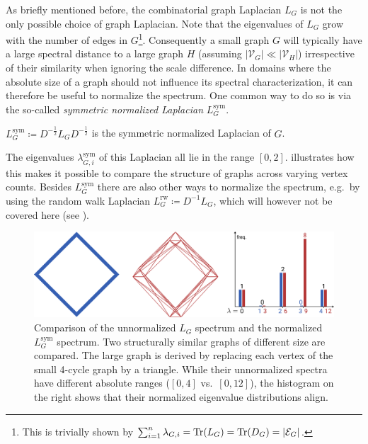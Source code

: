 As briefly mentioned before, the combinatorial graph Laplacian $L_G$ is not the only possible choice of graph Laplacian.
Note that the eigenvalues of $L_G$ grow with the number of edges in $G$\footnote{
	This is trivially shown by $\sum_{i=1}^n \lambda_{G,i} = \operatorname{Tr}(L_G) = \operatorname{Tr}(D_G) = |\mathcal{E}_G|$.
}.
Consequently a small graph $G$ will typically have a large spectral distance to a large graph $H$ (assuming ${|\mathcal{V}_G|} \ll {|\mathcal{V}_H|}$) irrespective of their similarity when ignoring the scale difference.
In domains where the absolute size of a graph should not influence its spectral characterization, it can therefore be useful to normalize the spectrum.
One common way to do so is via the so-called \textit{symmetric normalized Laplacian} $L^{\text{sym}}_G$.
\begin{defn}
	$L^{\text{sym}}_G \coloneqq D^{-\frac{1}{2}} L_G D^{-\frac{1}{2}}$ is the symmetric normalized Laplacian of $G$.
\end{defn}
The eigenvalues $\lambda^{\text{sym}}_{G, i}$  of this Laplacian all lie in the range $[0, 2]$.
 illustrates how this makes it possible to compare the structure of graphs across varying vertex counts.
Besides $L^{\text{sym}}_G$ there are also other ways to normalize the spectrum, e.g.\ by using the random walk Laplacian $L^{\text{rw}}_G \coloneqq D^{-1} L_G$, which will however not be covered here (see \citet{Shuman2013}).
\begin{figure}[ht]
	\centering
	\includegraphics[width=\linewidth]{gfx/related-work/spectral-normalization.pdf}
	\caption[Comparison of the unnormalized $L_G$ spectrum and the normalized $L^{\text{sym}}_G$ spectrum.]{
		Comparison of the unnormalized $L_G$ spectrum and the normalized $L^{\text{sym}}_G$ spectrum.
		Two structurally similar graphs of different size are compared.
		The \textcolor{t_red}{large graph} is derived by replacing each vertex of the \textcolor{t_blue}{small 4-cycle graph} by a triangle.
		While their unnormalized spectra have different absolute ranges (\textcolor{t_blue}{$[0, 4]$} vs.\ \textcolor{t_red}{$[0, 12]$}), the histogram on the right shows that their normalized eigenvalue distributions align.
	}\label{fig:related:spectral-normalization}
\end{figure}

